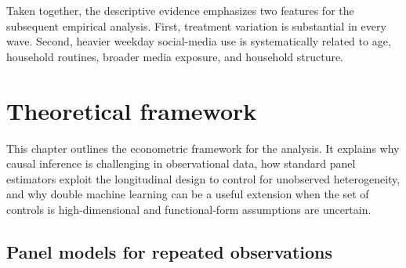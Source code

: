 \documentclass[11pt,oneside,a4paper]{book}
\newcommand{\tocchapter}[2]{%
  \chapter[#1]{#2}%
}
\newcommand{\tocsection}[2]{%
  \section[#1]{#2}%
}
\begin{document}
\FloatBarrier

Taken together, the descriptive evidence emphasizes two features for the subsequent empirical analysis. First, treatment variation is substantial in every wave. Second, heavier weekday social-media use is systematically related to age, household routines, broader media exposure, and household structure.

\tocchapter{Theoretical Framework}{Theoretical framework}
\label{chap:theory}

This chapter outlines the econometric framework for the analysis. It explains why causal inference is challenging in observational data, how standard panel estimators exploit the longitudinal design to control for unobserved heterogeneity, and why double machine learning can be a useful extension when the set of controls is high-dimensional and functional-form assumptions are uncertain.

\tocsection{Panel Models for Repeated Observations}{Panel models for repeated observations}
\end{document}
